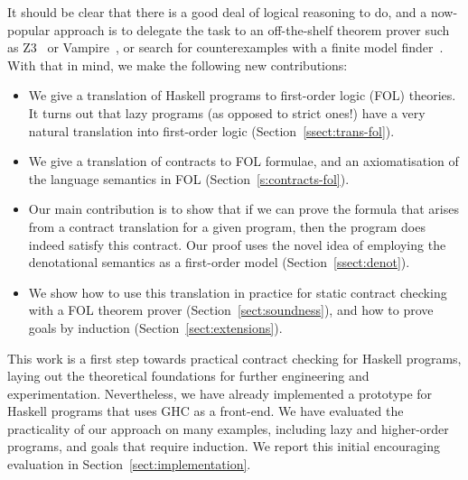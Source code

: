 It should be clear that there is a good deal of logical reasoning to do,
and a now-popular approach is to delegate the task to an off-the-shelf theorem
prover such as Z3~\cite{z3citation} or Vampire~\cite{vampire}, or search for
counterexamples with a finite model finder~\cite{paradox}.
With that in mind, we make the following new contributions:

\begin{itemize}
  \item We give a translation of Haskell programs to first-order logic (FOL) theories.
        It turns out that lazy programs (as opposed to
        strict ones!) have a very natural translation into first-order logic
        (Section~\ref{ssect:trans-fol}).
  \item We give a translation of contracts to FOL formulae, and an axiomatisation of
        the language semantics in FOL
        (Section~\ref{s:contracts-fol}).
  \item Our main contribution is to show that if we can prove the formula
        that arises from a contract translation
        for a given program, then the program does indeed satisfy this contract. Our proof
        uses the novel idea of employing the denotational
        semantics as a first-order model (Section~\ref{ssect:denot}).
  \item We show how to use this translation in practice for static contract checking with
        a FOL theorem prover (Section~\ref{sect:soundness}),
        and how to prove goals by induction (Section~\ref{sect:extensions}).
\end{itemize}

This work is a first step towards practical contract checking
for Haskell programs, laying out the theoretical foundations for further engineering
and experimentation. Nevertheless, we have already implemented a prototype for Haskell
programs that uses GHC as a front-end. We have evaluated the practicality of our approach
on many examples, including lazy and higher-order programs, and goals that require
induction. We report this initial encouraging evaluation in
Section~\ref{sect:implementation}.

